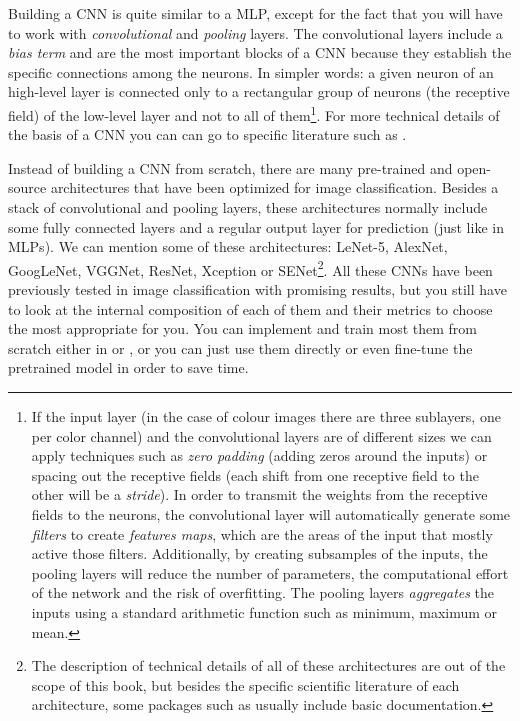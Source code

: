 Building a CNN is quite similar to a MLP, except for the fact that you will have to work with \textit{convolutional} and \textit{pooling} layers. The convolutional layers include a \textit{bias term} and are the most important blocks of a CNN because they establish the specific connections  among the neurons. In simpler words: a given neuron of an high-level layer is connected only to a rectangular group of neurons (the receptive field) of the low-level layer and not to all of them\footnote{If the input layer (in the case of colour images there are three sublayers, one per color channel) and the convolutional layers are of different sizes we can apply techniques such as \textit{zero padding} (adding zeros around the inputs) or spacing out the receptive fields (each shift from one receptive field to the other will be a \textit{stride}). In order to transmit the weights from the receptive fields to the neurons, the convolutional layer will automatically generate some \textit{filters} to create \textit{features maps}, which are the areas of the input that mostly active those filters. Additionally, by creating subsamples of the inputs, the pooling layers will reduce the number of parameters, the computational effort of the network and the risk of overfitting. The pooling layers \textit{aggregates} the inputs using a standard arithmetic function such as minimum, maximum or mean.}. For more technical details of the basis of a CNN you can can go to specific literature such as \cite{geron2019hands}.

Instead of building a CNN from scratch, there are many pre-trained and open-source architectures that have been optimized for image classification. Besides a stack of convolutional and pooling layers,  these architectures normally include some fully connected layers and a regular output layer for prediction (just like in MLPs). We can mention some of these architectures: LeNet-5, AlexNet, GoogLeNet, VGGNet, ResNet, Xception or SENet\footnote{The description of technical details of all of these architectures are out of the scope of this book, but besides the specific scientific literature of each architecture, some packages such as  usually include basic documentation.}. All these CNNs have been previously tested in image classification with promising results, but you still have to look at the internal composition of each of them and their metrics to choose the most appropriate for you. You can implement and train most them from scratch either in  or , or you can just use them directly or even fine-tune the pretrained model in order to save time. 

